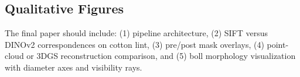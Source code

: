 \subsection{Qualitative Figures}

The final paper should include: (1) pipeline architecture, (2) SIFT versus DINOv2 correspondences on cotton lint, (3) pre/post mask overlays, (4) point-cloud or 3DGS reconstruction comparison, and (5) boll morphology visualization with diameter axes and visibility rays.

